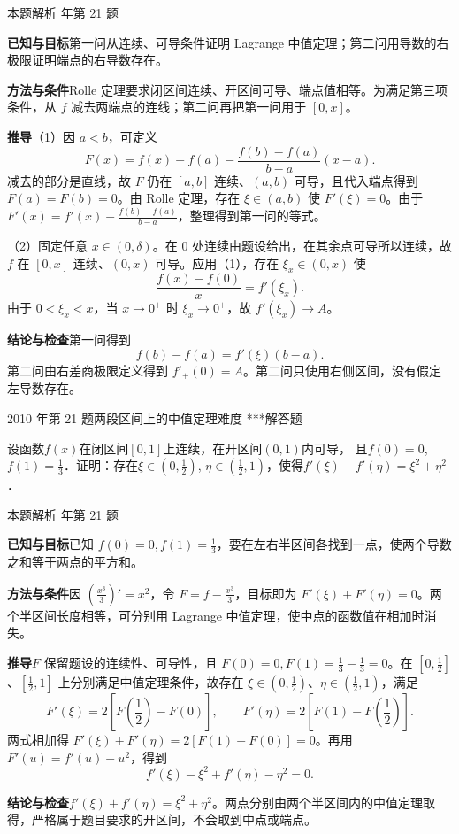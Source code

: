 \documentclass[UTF8,zihao=-4,fontset=fandol]{ctexart}
\newcounter{BankQuestion}
\newcommand{\QuestionPage}[7]{%
  \stepcounter{BankQuestion}%
  \par\noindent\begin{minipage}{\linewidth}
  \raggedright
  {\small\textcolor{black!60}{#3\quad #5\quad 难度 #7}\hfill\textcolor{accent}{#2}}\par\smallskip}
\newcommand{\QuestionEnd}{\end{minipage}\par\medskip}
\newcommand{\QuestionPage}[7]{%
  \clearpage
  \stepcounter{BankQuestion}%
  {\small\textcolor{accent}{#1\hfill #2}}\par\medskip
  {\small\textcolor{black!60}{#3\quad #5\quad 难度 #7\hfill \arabic{BankQuestion} / 234}}\par\vspace{9bp}}
\newcommand{\QuestionEnd}{}
\newenvironment{QuestionSolution}[1]{%
  \clearpage
  {\small\textcolor{black!60}{本题解析\quad #1}}\par\medskip
}{\par\clearpage}
\begin{document}
\begin{QuestionSolution}{2009 年第 21 题}
\textbf{已知与目标}\quad 第一问从连续、可导条件证明 Lagrange 中值定理；第二问用导数的右极限证明端点的右导数存在。

\textbf{方法与条件}\quad Rolle 定理要求闭区间连续、开区间可导、端点值相等。为满足第三项条件，从 \(f\) 减去两端点的连线；第二问再把第一问用于 \([0,x]\)。

\textbf{推导}\quad （1）因 \(a<b\)，可定义
\[
F(x)=f(x)-f(a)-\frac{f(b)-f(a)}{b-a}(x-a).
\]
减去的部分是直线，故 \(F\) 仍在 \([a,b]\) 连续、\((a,b)\) 可导，且代入端点得到 \(F(a)=F(b)=0\)。由 Rolle 定理，存在 \(\xi\in(a,b)\) 使 \(F'(\xi)=0\)。由于 \(F'(x)=f'(x)-\frac{f(b)-f(a)}{b-a}\)，整理得到第一问的等式。

（2）固定任意 \(x\in(0,\delta)\)。在 \(0\) 处连续由题设给出，在其余点可导所以连续，故 \(f\) 在 \([0,x]\) 连续、\((0,x)\) 可导。应用（1），存在 \(\xi_x\in(0,x)\) 使
\[
\frac{f(x)-f(0)}x=f'(\xi_x).
\]
由于 \(0<\xi_x<x\)，当 \(x\to0^+\) 时 \(\xi_x\to0^+\)，故 \(f'(\xi_x)\to A\)。

\textbf{结论与检查}\quad 第一问得到
\[\boxed{f(b)-f(a)=f'(\xi)(b-a)}.\]
第二问由右差商极限定义得到 \(\boxed{f'_+(0)=A}\)。第二问只使用右侧区间，没有假定左导数存在。
\end{QuestionSolution}

\QuestionPage{2.4 微分中值定理及其应用}{解答题}{2010 年第 21 题}{4}{两段区间上的中值定理}{088 / 234}{***}
设函数$f(x)$在闭区间$[0,1]$上连续，在开区间$(0,1)$内可导，
且$f(0) = 0$, $f(1) = \frac{1}{3}$．证明：存在$\xi \in \left(0,\frac{1}{2}\right)$,
$\eta \in \left(\frac{1}{2},1\right)$，使得$f'(\xi) + f'(\eta) = \xi^2 + \eta^2$．
\QuestionEnd

\begin{QuestionSolution}{2010 年第 21 题}
\textbf{已知与目标}\quad 已知 \(f(0)=0,f(1)=\frac13\)，要在左右半区间各找到一点，使两个导数之和等于两点的平方和。

\textbf{方法与条件}\quad 因 \((\frac{x^3}{3})'=x^2\)，令 \(F=f-\frac{x^3}{3}\)，目标即为 \(F'(\xi)+F'(\eta)=0\)。两个半区间长度相等，可分别用 Lagrange 中值定理，使中点的函数值在相加时消失。

\textbf{推导}\quad \(F\) 保留题设的连续性、可导性，且 \(F(0)=0,F(1)=\frac13-\frac13=0\)。在 \([0,\frac12]\)、\([\frac12,1]\) 上分别满足中值定理条件，故存在 \(\xi\in(0,\frac12)\)、\(\eta\in(\frac12,1)\)，满足
\[
F'(\xi)=2[F(\frac{1}{2})-F(0)],\qquad
F'(\eta)=2[F(1)-F(\frac{1}{2})].
\]
两式相加得 \(F'(\xi)+F'(\eta)=2[F(1)-F(0)]=0\)。再用 \(F'(u)=f'(u)-u^2\)，得到
\[f'(\xi)-\xi^2+f'(\eta)-\eta^2=0.\]

\textbf{结论与检查}\quad \(\boxed{f'(\xi)+f'(\eta)=\xi^2+\eta^2}\)。两点分别由两个半区间内的中值定理取得，严格属于题目要求的开区间，不会取到中点或端点。
\end{QuestionSolution}
\end{document}
